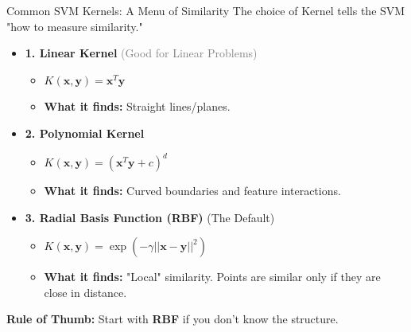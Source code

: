 \begin{frame}{Common SVM Kernels: A Menu of Similarity}
    The choice of Kernel tells the SVM "how to measure similarity."
    
    \vspace{0.5em}
    \begin{itemize}
        \item \textbf{1. Linear Kernel} \hfill \textcolor{gray}{\small (Good for Linear Problems)}
        \begin{itemize}
            \item \small $K(\mathbf{x}, \mathbf{y}) = \mathbf{x}^T \mathbf{y}$
            \item \textbf{What it finds:} Straight lines/planes. 
        \end{itemize}
        \vspace{0.5em}

        \item \textbf{2. Polynomial Kernel} \hfill \textcolor{gray}{}
        \begin{itemize}
            \item \small $K(\mathbf{x}, \mathbf{y}) = (\mathbf{x}^T \mathbf{y} + c)^d$
            \item \textbf{What it finds:} Curved boundaries and feature interactions.
        \end{itemize}
        \vspace{0.5em}

        \item \textbf{3. Radial Basis Function (RBF)} \hfill \textcolor{myblue}{\small (The Default)}
        \begin{itemize}
            \item \small $K(\mathbf{x}, \mathbf{y}) = \exp(-\gamma ||\mathbf{x} - \mathbf{y}||^2)$
            \item \textbf{What it finds:} "Local" similarity. Points are similar only if they are close in distance.
        \end{itemize}
    \end{itemize}

    \begin{tcolorbox}[colback=green!5, colframe=green!50!black, boxsep=2pt, left=4pt]
        \textbf{Rule of Thumb:} Start with \textbf{RBF} if you don't know the structure. 
    \end{tcolorbox}
\end{frame}


